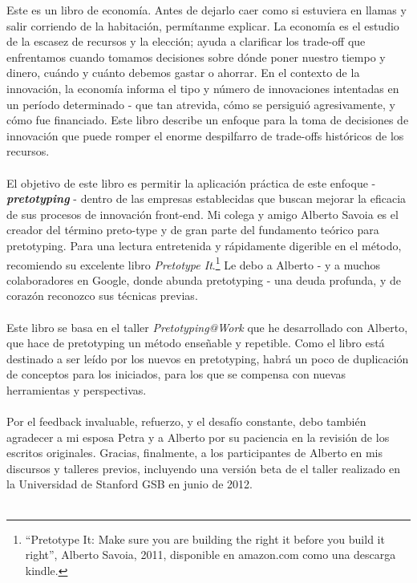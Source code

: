 \documentclass{article}
\begin{document}
Este es un libro de econom\'ia. Antes de dejarlo caer como si estuviera en llamas y salir corriendo de la habitaci\'on, perm\'itanme explicar.	La econom\'ia es el estudio de la escasez de recursos y la elecci\'on; ayuda a clarificar los trade-off que enfrentamos cuando tomamos decisiones sobre d\'onde poner nuestro tiempo y dinero, cu\'ando y cu\'anto debemos gastar o ahorrar.     En el contexto de la innovaci\'on, la econom\'ia informa el tipo y n\'umero de innovaciones intentadas en un per\'iodo determinado - que tan atrevida, c\'omo se persigui\'o agresivamente, y c\'omo fue financiado.     Este libro describe un enfoque para la toma de decisiones de innovaci\'on que puede romper el enorme despilfarro de trade-offs hist\'oricos de los recursos.
\\ \\
El objetivo de este libro es permitir la aplicaci\'on pr\'actica de este enfoque - \textbf{\textit{pretotyping}} - dentro de las empresas establecidas que buscan mejorar la eficacia de sus procesos de innovaci\'on front-end.     Mi colega y amigo Alberto Savoia es el creador del t\'ermino preto-type y de gran parte del fundamento te\'orico para pretotyping.     Para una lectura entretenida y r\'apidamente digerible en el m\'etodo, recomiendo su excelente libro \textit{Pretotype It}.\footnote{``Pretotype It: Make sure you are building the right it before you build it right'', Alberto Savoia, 2011, disponible en amazon.com como una descarga kindle.}     Le debo a Alberto - y a muchos colaboradores en Google, donde abunda pretotyping - una deuda profunda, y de coraz\'on reconozco sus t\'ecnicas previas.
\\ \\
Este libro se basa en el taller \textit{Pretotyping@Work} que he desarrollado con Alberto, que hace de pretotyping un m\'etodo ense\~nable y repetible.     Como el libro est\'a destinado a ser le\'ido por los nuevos en pretotyping, habr\'a un poco de duplicaci\'on de conceptos para los iniciados, para los que se compensa con nuevas herramientas y perspectivas.
\\ \\
Por el feedback invaluable, refuerzo, y el desaf\'io constante, debo tambi\'en agradecer a mi esposa Petra y a Alberto por su paciencia en la revisi\'on de los escritos originales.     Gracias, finalmente, a los participantes de Alberto en mis discursos y talleres previos, incluyendo una versi\'on beta de el taller realizado en la Universidad de Stanford GSB en junio de 2012.
\\ \\
\end{document}
